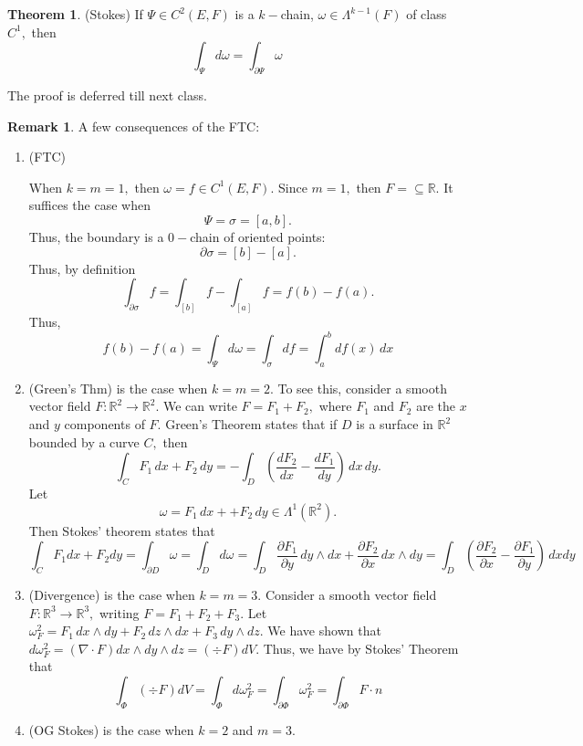 \documentclass[10pt, oneside]{article}
\newcommand{\bbR}{\mathbb{R}}
\theoremstyle{definition}
\newtheorem{thm}{Theorem}
\newtheorem{rem}{Remark}
\begin{document}
\begin{thm}
    (Stokes) If $\Psi \in C^2(E,F)$ is a $k-$chain, $\omega \in \Lambda^{k-1}(F)$ of class $C^1,$ then 
    \[\int_\Psi d\omega = \int_{\partial \Psi}\omega\]
\end{thm}
The proof is deferred till next class.
\begin{rem}
    A few consequences of the FTC:
    \begin{enumerate}
        \item (FTC)
        
        When $k = m = 1,$ then $\omega = f \in C^1(E,F).$ Since $m = 1,$ then $F = \subseteq \bbR.$ It suffices the case when 
        \[\Psi = \sigma = [a,b].\] Thus, the boundary is a $0-$chain of oriented points:
        \[\partial \sigma = [b] - [a].\] Thus, by definition
        \[\int_{\partial \sigma} f = \int_{[b]} f - \int_{[a]} f = f(b) - f(a).\] Thus, 
        \[f(b) - f(a) = \int_{\Psi} d\omega = \int_{\sigma} df = \int_a^b df(x)\,dx\]
    \item (Green's Thm) is the case when $k = m = 2.$ To see this, consider a smooth vector field $F: \bbR^2 \to \bbR^2.$ We can write $F = F_1 + F_2,$ where $F_1$ and $F_2$ are the $x$ and $y$ components of $F.$ Green's Theorem states that if $D$ is a surface in $\bbR^2$ bounded by a curve $C,$ then 
    \[\int_C F_1 \,dx + F_2\,dy = -\int_D \left(\frac{d F_2}{d x}- \frac{dF_1}{dy}\right) \,dx\,dy.\]
Let 
\[\omega = F_1\,dx++ F_2\,dy \in \Lambda^1(\bbR^2).\] Then Stokes' theorem states that 
\[\int_C F_1 dx + F_2dy= \int_{\partial D} \omega = \int_D d\omega = \int_D \frac{\partial F_1}{\partial y}\,dy \wedge dx +  \frac{\partial F_2}{\partial x}\,dx \wedge dy= \int_D \left(\frac{\partial F_2}{\partial x} - \frac{\partial F_1}{\partial y}\right)\,dxdy\]
    
    \item (Divergence) is the case when $k = m = 3.$
Consider a smooth vector field $F: \bbR^3 \to \bbR^3,$ writing $F = F_1 + F_2 + F_3.$ Let $\omega^2_F = F_1 \,dx\wedge dy + F_2 \,dz\wedge dx + F_3\,dy\wedge dz.$ We have shown that $d\omega_F^2 = (\nabla \cdot F) dx\wedge dy \wedge dz = (\div F)dV.$ Thus, we have by Stokes' Theorem that 
\[\int_{\Phi}(\div F)dV = \int_\Phi d\omega_F^2 = \int_{\partial \Phi}\omega_F^2 = \int_{\partial\Phi} F\cdot n\]
    \item (OG Stokes) is the case when $k = 2$ and $m =3.$ 
    \end{enumerate}
\end{rem}
\end{document}

